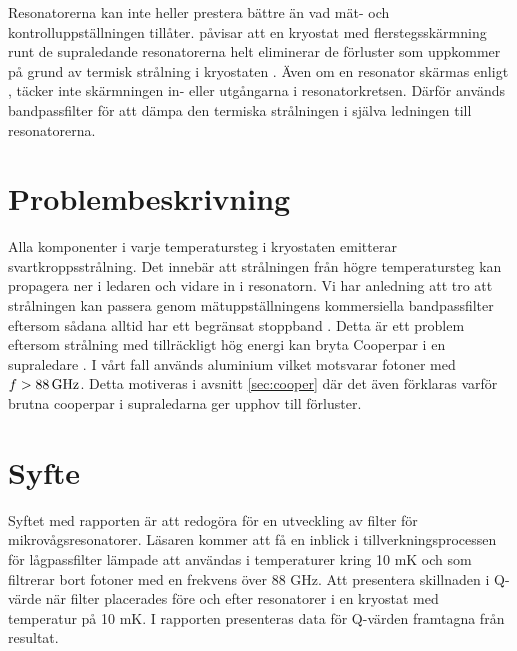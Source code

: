 \documentclass[main.tex]{subfiles}
\begin{document}
Resonatorerna kan inte heller prestera bättre än vad mät- och kontrolluppställningen tillåter. \citeauthor{Barends2011} påvisar att en kryostat med flerstegsskärmning runt de supraledande resonatorerna helt eliminerar de förluster som uppkommer på grund av termisk strålning i kryostaten \cite{Barends2011}. Även om en resonator skärmas enligt \cite{Barends2011}, täcker inte skärmningen in- eller utgångarna i resonatorkretsen. Därför används bandpassfilter för att dämpa den termiska strålningen i själva ledningen till resonatorerna.

\section{Problembeskrivning}


Alla komponenter i varje temperatursteg i kryostaten emitterar svartkroppsstrålning. Det innebär att strålningen från högre temperatursteg kan propagera ner i ledaren och vidare in i resonatorn. Vi har anledning att tro att strålningen kan passera genom mätuppställningens kommersiella bandpassfilter eftersom sådana alltid har ett begränsat stoppband \cite{santavicca2008}. Detta är ett problem eftersom strålning med tillräckligt hög energi kan bryta Cooperpar i en supraledare \cite{Gao2008}. I vårt fall används aluminium vilket motsvarar fotoner med $f>\unit[88]{GHz}$. Detta motiveras i avsnitt \ref{sec:cooper} där det även förklaras varför brutna cooperpar i supraledarna ger upphov till förluster.

\section{Syfte}
Syftet med rapporten är att redogöra för en utveckling av filter för mikrovågsresonatorer. Läsaren kommer att få en inblick i tillverkningsprocessen för lågpassfilter lämpade att användas i temperaturer kring 10 mK och som filtrerar bort fotoner med en frekvens över 88 GHz. Att presentera skillnaden i Q-värde när filter placerades före och efter resonatorer i en kryostat med temperatur på 10 mK. I rapporten presenteras data för Q-värden framtagna från resultat.

\end{document}
